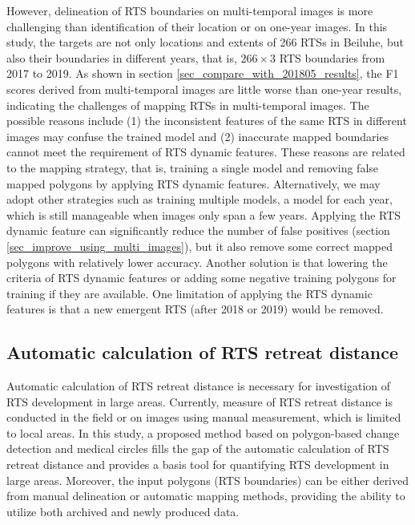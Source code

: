 \documentclass[authoryear,preprint,review,12pt]{elsarticle}
\begin{document}
However, delineation of RTS boundaries on multi-temporal images is more challenging than identification of their location or on one-year images. 
In this study, the targets are not only locations and extents of 266 RTSs in Beiluhe, but also their boundaries in different years, that is, $266\times3$ RTS boundaries from 2017 to 2019.
As shown in section \ref{sec_compare_with_201805_results}, the F1 scores derived from multi-temporal images are little worse than one-year results, indicating the challenges of mapping RTSs in multi-temporal images. 
The possible reasons include (1) the inconsistent features of the same RTS in different images may confuse the trained model 
and (2) inaccurate mapped boundaries cannot meet the requirement of RTS dynamic features. 
These reasons are related to the mapping strategy, that is, training a single model and removing false mapped polygons by applying RTS dynamic features.  
Alternatively, we may adopt other strategies such as training multiple models, a model for each year,  which is still manageable when images only span a few years.
Applying the RTS dynamic feature can significantly reduce the number of false positives (section \ref{sec_improve_using_multi_images}), but it also remove some correct mapped polygons with relatively lower accuracy. 
Another solution is that lowering the criteria of RTS dynamic features or adding some negative training polygons for training if they are available.
One limitation of applying the RTS dynamic features is that a new emergent RTS (after 2018 or 2019) would be removed. 



\subsection{Automatic calculation of RTS retreat distance}
\label{sec_diss_retreat_distance}

Automatic calculation of RTS retreat distance is necessary for investigation of RTS development in large areas.
Currently, measure of RTS retreat distance is conducted in the field or on images using manual measurement, which is limited to local areas. 
In this study, a proposed method based on polygon-based change detection and medical circles fills the gap of the automatic calculation of RTS retreat distance 
and provides a basis tool for quantifying RTS development in large areas. 
Moreover, the input polygons (RTS boundaries) can be either derived from manual delineation or automatic mapping methods, 
providing the ability to utilize both archived and newly produced data.
\end{document}
